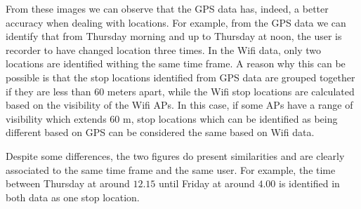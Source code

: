 From these images we can observe that the GPS data has, indeed, a better
accuracy when dealing with locations. For example, from the GPS data we can
identify that from Thursday morning and up to Thursday at noon, the user is
recorder to have changed location three times. In the Wifi data, only two
locations are identified withing the same time frame. A reason why this can be
possible is that the stop locations identified from GPS data are grouped
together if they are less than $60$ meters apart, while the Wifi stop locations
are calculated based on the visibility of the Wifi APs. In this case, if some
APs have a range of visibility which extends $60$ m, stop locations which can be
identified as being different based on GPS can be considered the same based on
Wifi data.

Despite some differences, the two figures do present similarities and are
clearly associated to the same time frame and the same user. For example, the
time between Thursday at around $12.15$ until Friday at around $4.00$ is
identified in both data as one stop location.

